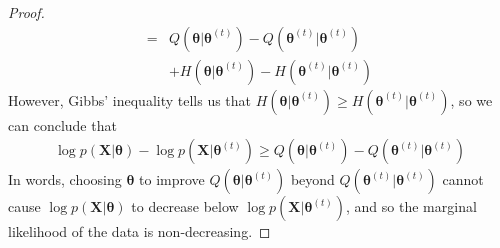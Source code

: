 \documentclass[9pt,landscape]{article}
\begin{document}
\begin{multicols}{3}
\begin{proof}
\begin{align*}
		= &Q(\boldsymbol\theta|\boldsymbol\theta^{(t)}) - Q(\boldsymbol\theta^{(t)}|\boldsymbol\theta^{(t)})\\
		&+ H(\boldsymbol\theta|\boldsymbol\theta^{(t)}) - H(\boldsymbol\theta^{(t)}|\boldsymbol\theta^{(t)})
	\end{align*}
	However, Gibbs' inequality tells us that $H(\boldsymbol\theta|\boldsymbol\theta^{(t)}) \ge H(\boldsymbol\theta^{(t)}|\boldsymbol\theta^{(t)})$, so we can conclude that
	\begin{align*}
		\log p(\mathbf{X}|\boldsymbol\theta) - \log p(\mathbf{X}|\boldsymbol\theta^{(t)})
		\ge Q(\boldsymbol\theta|\boldsymbol\theta^{(t)}) - Q(\boldsymbol\theta^{(t)}|\boldsymbol\theta^{(t)})
	\end{align*}
	In words, choosing $\boldsymbol\theta$ to improve $Q(\boldsymbol\theta|\boldsymbol\theta^{(t)})$ beyond $Q(\boldsymbol\theta^{(t)}|\boldsymbol\theta^{(t)})$ cannot cause $\log p(\mathbf{X}|\boldsymbol\theta)$ to decrease below $\log p(\mathbf{X}|\boldsymbol\theta^{(t)})$, and so the marginal likelihood of the data is non-decreasing.
\end{proof}

\end{multicols}
\end{document}
